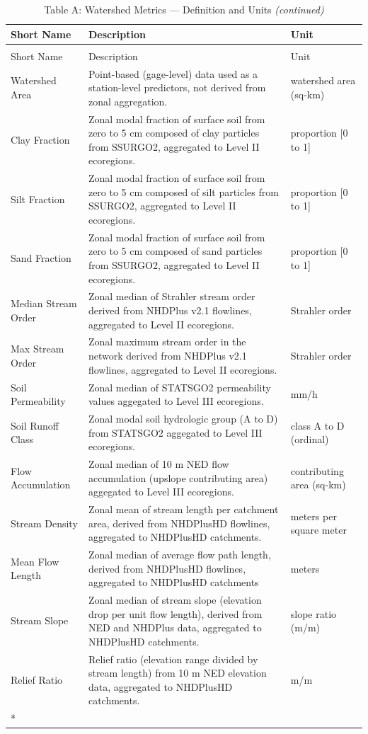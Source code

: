 \documentclass[
  10pt,
]{article}
\begin{document}
\begin{longtable}[t]{lp{8cm}l}
\caption{\label{tab:create_tables}Table A: Watershed Metrics — Definition and Units}\\
\toprule
Short Name & Description & Unit\\
\midrule
\endfirsthead
\caption[]{Table A: Watershed Metrics — Definition and Units \textit{(continued)}}\\
\toprule
Short Name & Description & Unit\\
\midrule
\endhead

\endfoot
\bottomrule
\endlastfoot
Watershed Area & Point-based (gage-level) data used as a station-level predictors, not
derived from zonal aggregation. & watershed area (sq-km)\\
Clay Fraction & Zonal modal fraction of surface soil from zero to 5 cm composed of
clay particles from SSURGO2, aggregated to Level II ecoregions. & proportion [0 to 1]\\
Silt Fraction & Zonal modal fraction of surface soil from zero to 5 cm composed of
silt particles from SSURGO2, aggregated to Level II ecoregions. & proportion [0 to 1]\\
Sand Fraction & Zonal modal fraction of surface soil from zero to 5 cm composed of
sand particles from SSURGO2, aggregated to Level II ecoregions. & proportion [0 to 1]\\
Median Stream Order & Zonal median of Strahler stream order derived from NHDPlus v2.1
flowlines, aggregated to Level II ecoregions. & Strahler order\\
\addlinespace
Max Stream Order & Zonal maximum stream order in the network derived from NHDPlus v2.1
flowlines, aggregated to Level II ecoregions. & Strahler order\\
Soil Permeability & Zonal median of STATSGO2 permeability values aggegated to Level III
ecoregions. & mm/h\\
Soil Runoff Class & Zonal modal soil hydrologic group (A to D) from STATSGO2 aggegated to
Level III ecoregions. & class A to D (ordinal)\\
Flow Accumulation & Zonal median of 10 m NED flow accumulation (upslope contributing area)
aggegated to Level III ecoregions. & contributing area (sq-km)\\
Stream Density & Zonal mean of stream length per catchment area, derived from NHDPlusHD
flowlines, aggregated to NHDPlusHD catchments. & meters per square meter\\
\addlinespace
Mean Flow Length & Zonal median of average flow path length, derived from NHDPlusHD
flowlines, aggregated to NHDPlusHD catchments & meters\\
Stream Slope & Zonal median of stream slope (elevation drop per unit flow length),
derived from NED and NHDPlus data, aggregated to NHDPlusHD catchments. & slope ratio (m/m)\\
Relief Ratio & Relief ratio (elevation range divided by stream length) from 10 m NED
elevation data, aggregated to NHDPlusHD catchments. & m/m\\*
\end{longtable}
\endgroup{}
\end{document}
